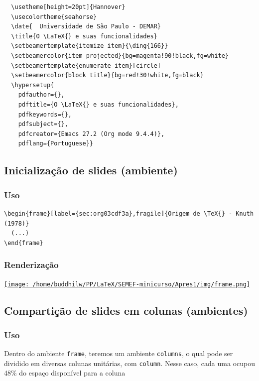 \documentclass[11pt]{article}
\begin{document}
\begin{verbatim}
  \usetheme[height=20pt]{Hannover}
  \usecolortheme{seahorse}
  \date{  Universidade de São Paulo - DEMAR}
  \title{O \LaTeX{} e suas funcionalidades}
  \setbeamertemplate{itemize item}{\ding{166}}
  \setbeamercolor{item projected}{bg=magenta!90!black,fg=white}
  \setbeamertemplate{enumerate item}[circle]
  \setbeamercolor{block title}{bg=red!30!white,fg=black}
  \hypersetup{
    pdfauthor={},
    pdftitle={O \LaTeX{} e suas funcionalidades},
    pdfkeywords={},
    pdfsubject={},
    pdfcreator={Emacs 27.2 (Org mode 9.4.4)}, 
    pdflang={Portuguese}}
\end{verbatim}

\subsection{Inicialização de slides (ambiente)}
\label{sec:org7146984}
\subsubsection{Uso}
\label{sec:org334bae9}
\begin{verbatim}
\begin{frame}[label={sec:org03cdf3a},fragile]{Origem de \TeX{} - Knuth (1978)}
  (...)
\end{frame}
\end{verbatim}

\subsubsection{Renderização}
\label{sec:orgf341f99}
\href{img/frame.png}{\texttt{[image: /home/buddhilw/PP/LaTeX/SEMEF-minicurso/Apres1/img/frame.png]}}

\subsection{Compartição de slides em colunas (ambientes)}
\label{sec:orgba84341}
\subsubsection{Uso}
\label{sec:org4fcb77a}

Dentro do ambiente \texttt{frame}, teremos um ambiente \texttt{columns}, o qual pode
ser dividido em diversas colunas unitárias, com  \texttt{column}. Nesse caso,
cada uma ocupou 48\% do espaço disponível para a coluna
\end{document}
